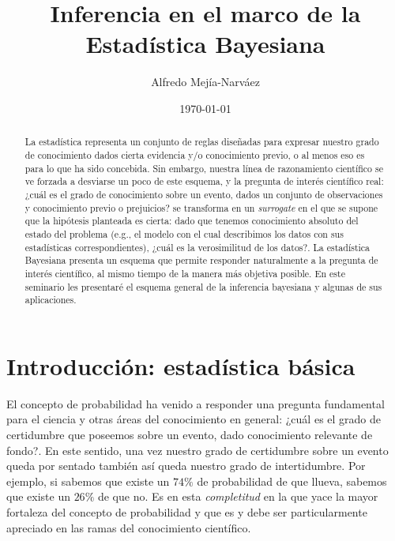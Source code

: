 \documentclass[a4paper,twoside]{article}
\title{Inferencia en el marco de la Estadística Bayesiana}
\author{Alfredo Mejía-Narváez}
\date{\today}
\begin{document}
\maketitle

\begin{abstract}
%
La estadística representa un conjunto de reglas diseñadas para expresar nuestro grado de
conocimiento dados cierta evidencia y/o conocimiento previo, o al menos eso es para lo que ha sido
concebida. Sin embargo, nuestra línea de razonamiento científico se ve forzada a desviarse un poco
de este esquema, y la pregunta de interés científico real: ¿cuál es el grado de conocimiento sobre
un evento, dados un conjunto de observaciones y conocimiento previo o prejuicios? se transforma en
un \emph{surrogate} en el que se supone que la hipótesis planteada es cierta: dado que tenemos
conocimiento absoluto del estado del problema (e.g., el modelo con el cual describimos los datos con
sus estadísticas correspondientes), ¿cuál es la verosimilitud de los datos?. La estadística
Bayesiana presenta un esquema que permite responder naturalmente a la pregunta de interés
científico, al mismo tiempo de la manera más objetiva posible. En este seminario les presentaré el
esquema general de la inferencia bayesiana y algunas de sus aplicaciones.
%
\end{abstract}


\section{Introducción: estadística básica}

El concepto de probabilidad ha venido a responder una pregunta fundamental para el ciencia y otras
áreas del conocimiento en general: ¿cuál es el grado de certidumbre que poseemos sobre un evento,
dado conocimiento relevante de fondo?. En este sentido, una vez nuestro grado de certidumbre sobre
un evento queda por sentado también así queda nuestro grado de intertidumbre. Por ejemplo, si
sabemos que existe un \(74\%\) de probabilidad de que llueva, sabemos que existe un \(26\%\) de que
no. Es en esta \emph{completitud} en la que yace la mayor fortaleza del concepto de probabilidad y
que es y debe ser particularmente apreciado en las ramas del conocimiento científico.
\end{document}
